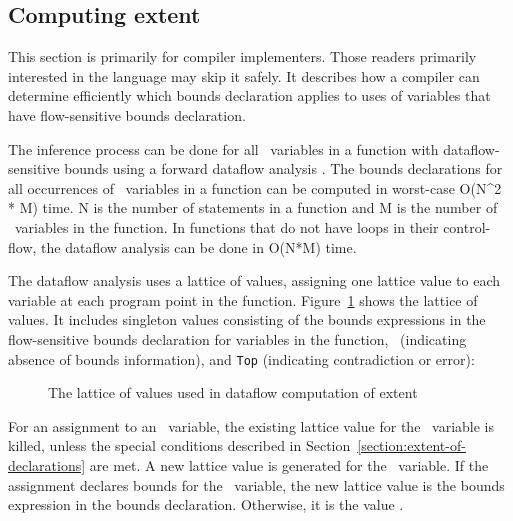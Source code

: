 \subsection{Computing extent}
\label{section:computing-extent}

This section is primarily for compiler implementers. Those readers
primarily interested in the language may skip it safely. It describes
how a compiler can determine efficiently which bounds declaration
applies to uses of variables that have flow-sensitive bounds
declaration.

The inference process can be done for all \arrayptr\ variables
in a function with dataflow-sensitive bounds using a forward dataflow
analysis \cite{Aho2007}. The bounds declarations for all occurrences of
\arrayptr\ variables in a function can be computed in
worst-case O(N\^{}2 * M) time. N is the number of statements in a
function and M is the number of \arrayptr\ variables in the
function. In functions that do not have loops in their control-flow, the
dataflow analysis can be done in O(N*M) time.

The dataflow analysis uses a lattice of values, assigning one lattice
value to each variable at each program point in the function.  
Figure~\ref{fig:extent-dataflow-lattice} shows the lattice of values.  
It includes singleton values consisting of the bounds
expressions in the flow-sensitive bounds declaration for variables in
the function, \boundsunknown\ (indicating absence of bounds
information), and \texttt{Top} (indicating contradiction or error):

\begin{figure}
\begin{center}
\end{center}
\caption{The lattice of values used in dataflow computation of extent}
\label{fig:extent-dataflow-lattice}
\end{figure}
 
For an assignment to an \arrayptr\ variable, the existing
lattice value for the \arrayptr\ variable is killed, unless
the special conditions described in Section~\ref{section:extent-of-declarations}
are met. 
A new lattice value is generated for the \arrayptr\ variable. If the
assignment declares bounds for the \arrayptr\ variable, the new
lattice value is the bounds expression in the bounds declaration.
Otherwise, it is the value \boundsunknown.

